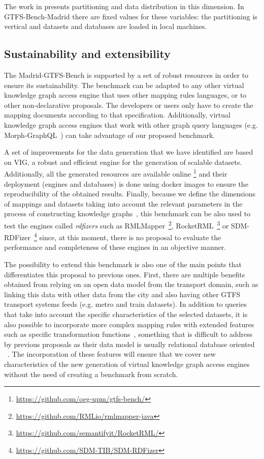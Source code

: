 The work in \citep{montoya2012benchmarking} presents partitioning and data distribution in this dimension. In GTFS-Bench-Madrid there are fixed values for these variables: the partitioning is vertical and datasets and databases are loaded in local machines.





\subsection{Sustainability and extensibility}
The Madrid-GTFS-Bench is supported by a set of robust resources in order to ensure its sustainability. The benchmark can be adapted to any other virtual knowledge graph access engine that uses other mapping rules languages, or to other non-declarative proposals. The developers or users only have to create the mapping documents according to that specification. Additionally, virtual knowledge graph access engines that work with other graph query languages (e.g. Morph-GraphQL~\citep{priyatna2019morph}) can take advantage of our proposed benchmark. 

A set of improvements for the data generation that we have identified are based on VIG, a robust and efficient engine for the generation of scalable datasets. Additionally, all the generated resources are available online \footnote{\url{https://github.com/oeg-upm/gtfs-bench/}} and their deployment (engines and databases) is done using docker images to ensure the reproducibility of the obtained results. Finally, because we define the dimensions of mappings and datasets taking into account the relevant parameters in the process of constructing knowledge graphs~\citep{chaves2019what}, this benchmark can be also used to test the engines called \textit{rdfizers} such as RMLMapper~\footnote{\url{https://github.com/RMLio/rmlmapper-java}}, RocketRML~\footnote{\url{https://github.com/semantifyit/RocketRML/}} or SDM-RDFizer~\footnote{\url{https://github.com/SDM-TIB/SDM-RDFizer}} since, at this moment, there is no proposal to evaluate the performance and completeness of these engines in an objective manner.

The possibility to extend this benchmark is also one of the main points that differentiates this proposal to previous ones. First, there are multiple benefits obtained from relying on an open data model from the transport domain, such as linking this data with other data from the city and also having other GTFS transport systems feeds (e.g. metro and train datasets). In addition to queries that take into account the specific characteristics of the selected datasets, it is also possible to incorporate more complex mapping rules with extended features such as specific transformation functions~\citep{de2016ontology}, something that is difficult to address by previous proposals as their data model is usually relational database oriented ~\citep{bizer2009berlin,lanti2015npd}. The incorporation of these features will ensure that we cover new characteristics of the new generation of virtual knowledge graph access engines without the need of creating a benchmark from scratch.  


